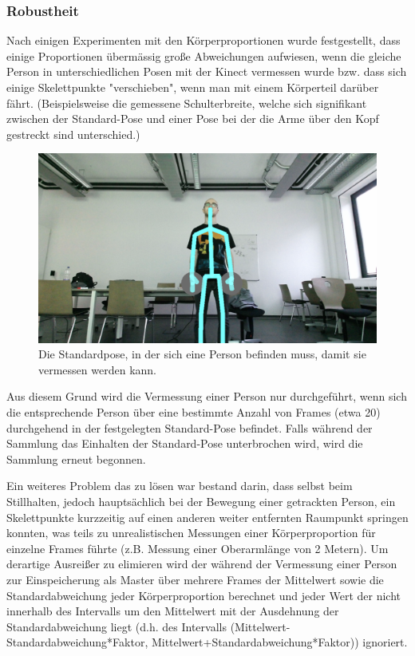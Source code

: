 \subsubsection{Robustheit}
Nach einigen Experimenten mit den Körperproportionen wurde festgestellt, dass einige Proportionen übermässig große Abweichungen aufwiesen, wenn die gleiche Person in unterschiedlichen Posen mit der Kinect vermessen wurde bzw. dass sich einige Skelettpunkte "verschieben", wenn man mit einem Körperteil darüber fährt. (Beispielsweise die gemessene Schulterbreite, welche sich signifikant zwischen der Standard-Pose und einer Pose bei der die Arme über den Kopf gestreckt sind unterschied.) 
\begin{figure}[h!]
		\centering
		\includegraphics[width=.8\textwidth]{pictures/standardpose_.png}
		\caption{Die Standardpose, in der sich eine Person befinden muss, damit sie vermessen werden kann.}\label{fig:standardp}
		\end{figure}
Aus diesem Grund wird die Vermessung einer Person nur durchgeführt, wenn sich die entsprechende Person über eine bestimmte Anzahl von Frames (etwa 20) durchgehend in der festgelegten Standard-Pose befindet. Falls während der Sammlung das Einhalten der Standard-Pose unterbrochen wird, wird die Sammlung erneut begonnen.\par
Ein weiteres Problem das zu lösen war bestand darin, dass selbst beim Stillhalten, jedoch hauptsächlich bei der Bewegung einer getrackten Person, ein Skelettpunkte kurzzeitig auf einen anderen weiter entfernten Raumpunkt springen konnten, was teils zu unrealistischen Messungen einer Körperproportion für einzelne Frames führte (z.B. Messung einer Oberarmlänge von 2 Metern). Um derartige Ausreißer zu elimieren wird der während der Vermessung einer Person zur Einspeicherung als Master über mehrere Frames der Mittelwert sowie die Standardabweichung jeder Körperproportion berechnet und jeder Wert der nicht innerhalb des Intervalls um den Mittelwert mit der Ausdehnung der Standardabweichung liegt (d.h. des Intervalls (Mittelwert-Standardabweichung*Faktor, Mittelwert+Standardabweichung*Faktor)) ignoriert. 
